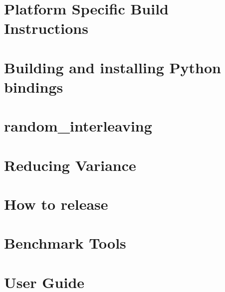 \let\mypdfximage\pdfximage\def\pdfximage{\immediate\mypdfximage}\documentclass[twoside]{book}
\newcommand{\+}{\discretionary{\mbox{\scriptsize$\hookleftarrow$}}{}{}}
\begin{document}
\chapter{Platform Specific Build Instructions}
\label{md_build__deps_googlebenchmark_src_docs_platform_specific_build_instructions}

\chapter{Building and installing Python bindings}
\label{md_build__deps_googlebenchmark_src_docs_python_bindings}

\chapter{random\+\_\+interleaving}
\label{md_build__deps_googlebenchmark_src_docs_random_interleaving}

\chapter{Reducing Variance}
\label{md_build__deps_googlebenchmark_src_docs_reducing_variance}

\chapter{How to release}
\label{md_build__deps_googlebenchmark_src_docs_releasing}

\chapter{Benchmark Tools}
\label{md_build__deps_googlebenchmark_src_docs_tools}

\chapter{User Guide}
\label{md_build__deps_googlebenchmark_src_docs_user_guide}

\end{document}
